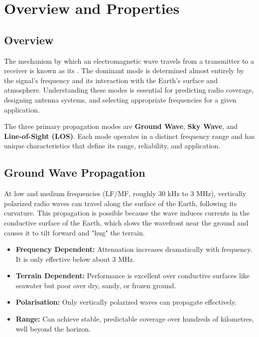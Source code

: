\section{Overview and Properties}

\subsection{Overview}

The mechanism by which an electromagnetic wave travels from a transmitter to a receiver is known as its . The dominant mode is determined almost entirely by the signal's frequency and its interaction with the Earth's surface and atmosphere. Understanding these modes is essential for predicting radio coverage, designing antenna systems, and selecting appropriate frequencies for a given application.

\begin{keyconcept}
    The three primary propagation modes are \textbf{Ground Wave}, \textbf{Sky Wave}, and \textbf{Line-of-Sight (LOS)}. Each mode operates in a distinct frequency range and has unique characteristics that define its range, reliability, and application.
\end{keyconcept}


\subsection{Ground Wave Propagation}

At low and medium frequencies (LF/MF, roughly 30 kHz to 3 MHz), vertically polarized radio waves can travel along the surface of the Earth, following its curvature. This  propagation is possible because the wave induces currents in the conductive surface of the Earth, which slows the wavefront near the ground and causes it to tilt forward and "hug" the terrain.

\begin{itemize}
    \item \textbf{Frequency Dependent:} Attenuation increases dramatically with frequency. It is only effective below about 3 MHz.
    \item \textbf{Terrain Dependent:} Performance is excellent over conductive surfaces like seawater but poor over dry, sandy, or frozen ground.
    \item \textbf{Polarisation:} Only vertically polarized waves can propagate effectively.
    \item \textbf{Range:} Can achieve stable, predictable coverage over hundreds of kilometres, well beyond the horizon.
\end{itemize}

